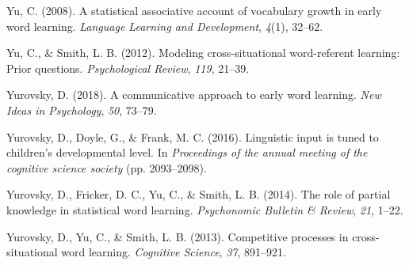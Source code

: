 \documentclass[english,,man,floatsintext]{apa6}
\begin{document}
\leavevmode\hypertarget{ref-yu2008}{}%
Yu, C. (2008). A statistical associative account of vocabulary growth in early word learning. \emph{Language Learning and Development}, \emph{4}(1), 32--62.

\leavevmode\hypertarget{ref-yu2012}{}%
Yu, C., \& Smith, L. B. (2012). Modeling cross-situational word-referent learning: Prior questions. \emph{Psychological Review}, \emph{119}, 21--39.

\leavevmode\hypertarget{ref-yurovsky2018}{}%
Yurovsky, D. (2018). A communicative approach to early word learning. \emph{New Ideas in Psychology}, \emph{50}, 73--79.

\leavevmode\hypertarget{ref-yurovsky2016}{}%
Yurovsky, D., Doyle, G., \& Frank, M. C. (2016). Linguistic input is tuned to children's developmental level. In \emph{Proceedings of the annual meeting of the cognitive science society} (pp. 2093--2098).

\leavevmode\hypertarget{ref-yurovsky2014}{}%
Yurovsky, D., Fricker, D. C., Yu, C., \& Smith, L. B. (2014). The role of partial knowledge in statistical word learning. \emph{Psychonomic Bulletin \& Review}, \emph{21}, 1--22.

\leavevmode\hypertarget{ref-yurovsky2013}{}%
Yurovsky, D., Yu, C., \& Smith, L. B. (2013). Competitive processes in cross-situational word learning. \emph{Cognitive Science}, \emph{37}, 891--921.
\end{document}
